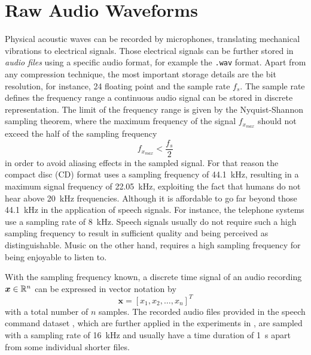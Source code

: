 
\section{Raw Audio Waveforms}\label{sec:signal_raw}
Physical acoustic waves can be recorded by microphones, translating mechanical vibrations to electrical signals. 
Those electrical signals can be further stored in \emph{audio files} using a specific audio format, for example the \texttt{.wav} format.
Apart from any compression technique, the most important storage details are the bit resolution, for instance, \SI{24}{\bit} floating point and the sample rate $f_s$.
The sample rate defines the frequency range a continuous audio signal can be stored in discrete representation.
The limit of the frequency range is given by the Nyquist-Shannon sampling theorem, where the maximum frequency of the signal $f_{x_{max}}$ should not exceed the half of the sampling frequency
\begin{equation}\label{eq:signal_raw_nyquist}
  f_{x_{max}} < \frac{f_s}{2}
\end{equation}
in order to avoid aliasing effects in the sampled signal.
For that reason the compact disc (CD) format uses a sampling frequency of \SI{44.1}{\kilo\hertz}, resulting in a maximum signal frequency of \SI{22.05}{\kilo\hertz}, exploiting the fact that humans do not hear above \SI{20}{\kilo\hertz} frequencies.
Although it is affordable to go far beyond those \SI{44.1}{\kilo\hertz} in the application of speech signals. 
For instance, the telephone systems use a sampling rate of \SI{8}{\kilo\hertz}.
Speech signals usually do not require such a high sampling frequency to result in sufficient quality and being perceived as distinguishable.
Music on the other hand, requires a high sampling frequency for being enjoyable to listen to.

With the sampling frequency known, a discrete time signal of an audio recording $\bm{x} \in \mathbb{R}^n$ can be expressed in vector notation by
\begin{equation}\label{eq:signal_raw_x}
  \bm{x} = [x_1, x_2, \dots, x_n]^T
\end{equation}
with a total number of $n$ samples.
The recorded audio files provided in the speech command dataset \cite{Warden2018}, which are further applied in the experiments in , are sampled with a sampling rate of \SI{16}{\kilo\hertz} and usually have a time duration of \SI{1}{\second} apart from some individual shorter files.

